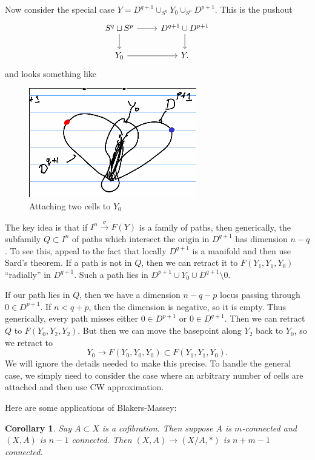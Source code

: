 \documentclass[leqno, openany]{memoir}
\newtheorem{cor}[thm]{Corollary}
\theoremstyle{definition}
\theoremstyle{remark}
\theoremstyle{plain}
\theoremstyle{definition}
\theoremstyle{remark}
\begin{document}
Now consider the special case $Y = D^{q+1} \cup_{S^q} Y_0 \cup_{S^p} D^{p+1}$. This is the pushout
\begin{equation*}
\begin{tikzcd}
    S^q \sqcup S^p \arrow{d} \arrow{r} & D^{q+1} \cup D^{p+1} \arrow{d} \\
    Y_0 \arrow{r} & Y.
\end{tikzcd}
\end{equation*}
and looks something like
\begin{figure}[H]
    \centering
    \includegraphics[scale=0.8]{attachcell.png}
    \caption{Attaching two cells to $Y_0$}%
    \label{fig:attachcell}
\end{figure}
The key idea is that if $I^n \xrightarrow{\sigma} F(Y)$ is a family of paths, then generically, the subfamily $Q \subset  I^n$ of paths which intersect the origin in $D^{q+1}$ has dimension $n-q$. To see this, appeal to the fact that locally $D^{q+1}$ is a manifold and then use Sard's theorem. If a path is not in $Q$, then we can retract it to $F(Y_1, Y_1, Y_0)$ ``radially'' in $D^{q+1}$. Such a path lies in $D^{p+1} \cup Y_0 \cup D^{q+1} \setminus 0$.

If our path lies in $Q$, then we have a dimension $n-q-p$ locus passing through $0 \in D^{p+1}$. If $n < q+p$, then the dimension is negative, so it is empty. Thus generically, every path misses either $0 \in D^{p+1}$ or $0 \in D^{q+1}$. Then we can retract $Q$ to $F(Y_0, Y_2, Y_2)$. But then we can move the basepoint along $Y_2$ back to $Y_0$, so we retract to
\[ Y_0 \to F(Y_0, Y_0, Y_0) \subset F(Y_1, Y_1, Y_0). \]
We will ignore the details needed to make this precise. To handle the general case, we simply need to consider the case where an arbitrary number of cells are attached and then use CW approximation.

Here are some applications of Blakers-Massey:
\begin{cor}
    Say $A \subset X$ is a cofibration. Then suppose $A$ is $m$-connected and $(X,A)$ is $n-1$ connected. Then $(X,A) \to (X/A, *)$ is $n+m-1$ connected.
\end{cor}
\end{document}
